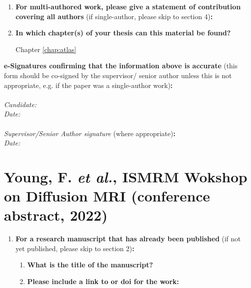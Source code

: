 \documentclass[12pt,phd,a4paper,twoside]{ucl_thesis}
\begin{document}
{\begin{enumerate}[leftmargin=*,label={\bfseries\arabic*.}]
\item \textbf{For multi-authored work, please give a statement of contribution covering all authors} (if single-author, please skip to section 4)\textbf{:}
\item \textbf{In which chapter(s) of your thesis can this material be found?}

Chapter \ref{chap:atlas}
\end{enumerate}

\textbf{e-Signatures confirming that the information above is accurate}
(this form should be co-signed by the supervisor/ senior author unless this is not appropriate, e.g. if the paper was a single-author work)\textbf{:}\\
\\[\baselineskip]
\textit{Candidate:}
\\[\baselineskip]
\textit{Date:}\\\signdate
\\[\baselineskip]
\textit{Supervisor/Senior Author signature} (where appropriate)\textbf{:}
\\[\baselineskip]
\textit{Date:}\\\signdate

\section*{Young, F. \textit{et al.}, ISMRM Wokshop on Diffusion MRI (conference abstract, 2022)}
\begin{enumerate}[leftmargin=*,label={\bfseries\arabic*.}]\itemsep0em
\item \textbf{For a research manuscript that has already been published} (if not yet published, please skip to section 2)\textbf{:}
\begin{enumerate}[label={\alph*)}]\itemsep0em
\item \textbf{What is the title of the manuscript?}

	\item \textbf{Please include a link to or doi for the work:}


\end{enumerate}
\end{enumerate}}
\end{document}
